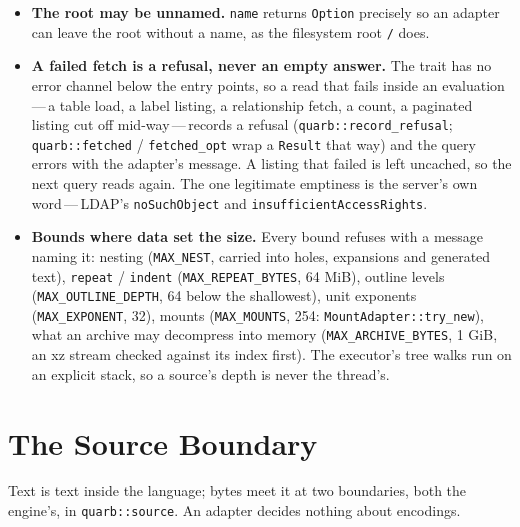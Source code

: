 \documentclass{report}
\begin{document}
\begin{itemize}
\item \textbf{The root may be unnamed.} \texttt{name} returns
  \texttt{Option} precisely so an adapter can leave the root without a
  name, as the filesystem root \texttt{/} does.

\item \textbf{A failed fetch is a refusal, never an empty answer.}
  The trait has no error channel below the entry points, so a read
  that fails inside an evaluation\,---\,a table load, a label
  listing, a relationship fetch, a count, a paginated listing cut
  off mid-way\,---\,records a refusal
  (\texttt{quarb::record\_refusal}; \texttt{quarb::fetched} /
  \texttt{fetched\_opt} wrap a \texttt{Result} that way) and the
  query errors with the adapter's message. A listing that failed is
  left uncached, so the next query reads again. The one legitimate
  emptiness is the server's own word\,---\,LDAP's
  \texttt{noSuchObject} and \texttt{insufficientAccessRights}.

\item \textbf{Bounds where data set the size.} Every bound refuses
  with a message naming it: nesting (\texttt{MAX\_NEST}, carried
  into holes, expansions and generated text), \texttt{repeat} /
  \texttt{indent} (\texttt{MAX\_REPEAT\_BYTES}, 64 MiB), outline
  levels (\texttt{MAX\_OUTLINE\_DEPTH}, 64 below the shallowest),
  unit exponents (\texttt{MAX\_EXPONENT}, 32), mounts
  (\texttt{MAX\_MOUNTS}, 254: \texttt{MountAdapter::try\_new}),
  what an archive may decompress into memory
  (\texttt{MAX\_ARCHIVE\_BYTES}, 1 GiB, an xz stream checked
  against its index first). The executor's tree walks run on an
  explicit stack, so a source's depth is never the thread's.
\end{itemize}

\section{The Source Boundary}\label{sec:source-boundary}

Text is text inside the language; bytes meet it at two boundaries,
both the engine's, in \texttt{quarb::source}. An adapter decides
nothing about encodings.
\end{document}
